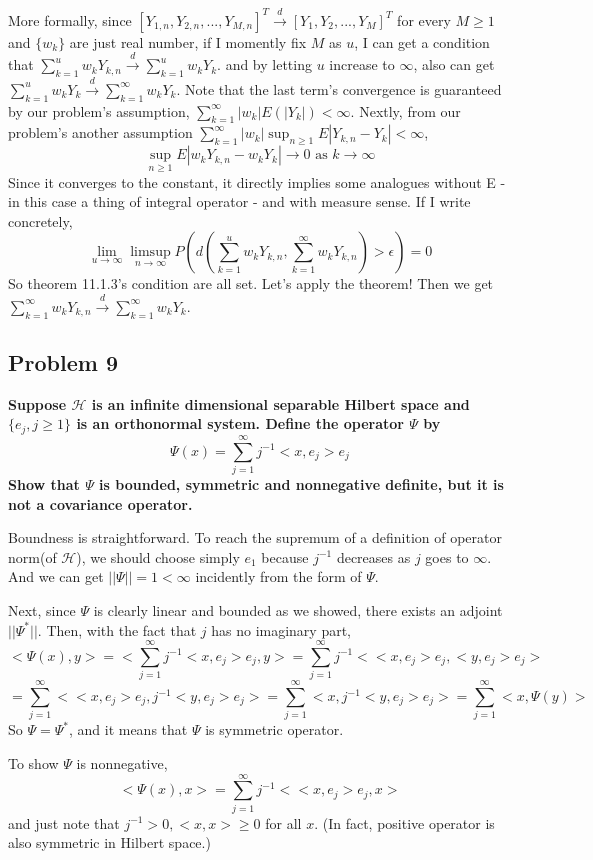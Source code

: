 \documentclass{article}
\begin{document}
More formally, since \([Y_{1,n},Y_{2,n},...,Y_{M,n}]^T\xrightarrow{d} [Y_1,Y_2,...,Y_M]^T\) for every $M\geq1$ and
$\{w_k\}$ are just real number,
if I momently fix $M$ as $u$, I can get a condition that \(\sum_{k=1}^{u}w_kY_{k,n}\xrightarrow{d}\sum_{k=1}^{u}w_kY_{k}\).
and by letting $u$ increase to $\infty$, also can get 
\(\sum_{k=1}^{u}w_kY_{k}\xrightarrow{d}\sum_{k=1}^{\infty}w_kY_{k}\).
Note that the last term's convergence is guaranteed by our problem's assumption, \(\sum_{k=1}^{\infty}|w_k| E(|Y_k|)<\infty\).
Nextly, from our problem's another assumption $\sum_{k=1}^{\infty}|w_k|\sup_{n\geq 1}E|Y_{k,n}-Y_k|<\infty$,
\[\sup_{n\geq 1}E|w_kY_{k,n}-w_kY_k|\rightarrow0 \text{ as } k\rightarrow\infty \]
Since it converges to the constant, it directly implies some analogues without E - in this case a thing of integral operator - and with measure sense.
If I write concretely,
\[\lim_{u\rightarrow\infty}\limsup_{n\rightarrow\infty}P(d(\sum_{k=1}^{u}w_kY_{k,n},\sum_{k=1}^{\infty}w_kY_{k,n})>\epsilon)=0\]
So theorem 11.1.3's condition are all set. Let's apply the theorem! Then we get
\(\sum_{k=1}^{\infty}w_kY_{k,n}\xrightarrow{d}\sum_{k=1}^{\infty}w_kY_k\).

\subsection{Problem 9}
\textbf{
    Suppose $\mathcal{H}$ is an infinite dimensional separable Hilbert space and $\{e_j,j\geq1\}$ is an orthonormal system.
    Define the operator $\Psi$ by
    \[\Psi(x)=\sum_{j=1}^{\infty}j^{-1}<x,e_j>e_j\]
    Show that $\Psi$ is bounded, symmetric and nonnegative definite, but it is not a covariance operator.
}

Boundness is straightforward. To reach the supremum of a definition of operator norm(of $\mathcal{H}$),
we should choose simply $e_1$ because $j^{-1}$ decreases as $j$ goes to $\infty$.
And we can get $||\Psi||=1<\infty$ incidently from the form of $\Psi$.

Next, since $\Psi$ is clearly linear and bounded as we showed, there exists an adjoint $||\Psi^*||$.
Then, with the fact that $j$ has no imaginary part,
\[<\Psi(x),y>=<\sum_{j=1}^{\infty}j^{-1}<x,e_j>e_j,y>
=\sum_{j=1}^{\infty}j^{-1}<<x,e_j>e_j,<y,e_j>e_j>\]
\[=\sum_{j=1}^{\infty}<<x,e_j>e_j,j^{-1}<y,e_j>e_j>
=\sum_{j=1}^{\infty}<x,j^{-1}<y,e_j>e_j>
=\sum_{j=1}^{\infty}<x,\Psi(y)>\]
So $\Psi=\Psi^*$, and it means that $\Psi$ is symmetric operator.

To show $\Psi$ is nonnegative,
\[<\Psi(x),x>=\sum_{j=1}^{\infty}j^{-1}<<x,e_j>e_j,x>\]
and just note that $j^{-1}>0, <x,x>\geq0$ for all $x$. (In fact, positive operator is also symmetric in Hilbert space.)
\end{document}
